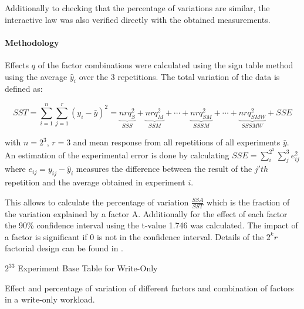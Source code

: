 \documentclass[report.tex]{subfiles}
\begin{document}
Additionally to checking that the percentage of variations are similar, the interactive law was also verified directly with the obtained measurements. 

\paragraph{Methodology}

Effects $q$ of the factor combinations were calculated using the sign table method using the average $\hat{y}_i$ over the 3 repetitions.
The total variation of the data is defined as: 

\begin{equation}
 	SST = \sum_{i=1}^n\sum_{j=1}^r (y_i - \bar{y})^2 = \underbrace{nrq_S^2}_{SSS} + \underbrace{nrq_M^2}_{SSM} + \cdots +  \underbrace{nrq_{SM}^2}_{SSSM} + \cdots + \underbrace{nrq_{SMW}^2}_{SSSMW} + SSE
\end{equation}

with $n=2^3$, $r=3$ and mean response from all repetitions of all experiments $\bar{y}$. 
An estimation of the experimental error is done by  calculating  $SSE = \sum_{i}^{2^3}\sum_{j}^{3} e_{ij}^2$ where $e_{ij} = y_{ij} - \hat{y}_{i}$ measures the difference between the result of the $j'th$ repetition and the average obtained in experiment $i$.

This allows to calculate the percentage of variation $\frac{SSA}{SST}$ which is the fraction of the variation explained by a factor A.
Additionally for the effect of each factor the 90\% confidence interval using the t-value 1.746 was calculated.
The impact of a factor is significant if 0 is not in the confidence interval.
Details of the $2^{k}r$ factorial design can be found in \cite{books/daglib/0076234}.

\begin{table}
	\centering
	\small{
		\setlength{\tabcolsep}{3.9pt}
		
		\caption{$2^33$ Experiment Base Table for Write-Only}\label{exp60_wo_2k_base} 
	}
\end{table}



\begin{table}
	\small{
		\centering	
		
		\setlength{\tabcolsep}{4.1pt}
		\newcommand{\rlft}[0]{\raggedleft\arraybackslash}
		
		\caption{Effect and percentage of variation of different factors and combination of factors in a write-only workload.}\label{exp60_wo_2k_effect}
	}
\end{table}
\end{document}
